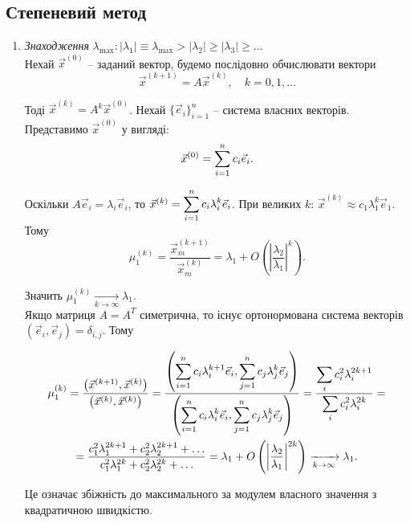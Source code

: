 \subsection{Степеневий метод}
\begin{enumerate}
	\item \textit{Знаходження} $\lambda_{\max}: |\lambda_1|\equiv\lambda_{\max}> |\lambda_2| \ge |\lambda_3| \ge \ldots$ \\

	Нехай $\vec x^{(0)}$ -- заданий вектор, будемо послідовно обчислювати вектори
	\begin{equation}
		\label{eq:5.2}
		\vec x^{(k+1)} = A \vec x^{(k)}, \quad k = 0, 1, \ldots
	\end{equation}

	Тоді $\vec x^{(k)} = A^k \vec x^{(0)}$. Нехай $\{\vec e_i\}_{i=1}^n$ -- система власних векторів. Представимо $\vec x^{(0)}$ у вигляді: \[ \vec x^{(0)} = \displaystyle\sum\limits_{i=1}^n c_i \vec e_i. \]

	Оскільки $A \vec e_i = \lambda_i \vec e_i$, то $\vec x^{(k)} = \displaystyle\sum\limits_{i=1}^n c_i \lambda_i^k \vec e_i$. При великих $k$: $\vec x^{(k)} \approx c_1 \lambda_1^k \vec e_1$. \\

	Тому \[ \mu_1^{(k)} = \dfrac{\vec x_m^{(k+1)}}{\vec x_m^{(k)}} = \lambda_1 + O \left( \left| \dfrac{\lambda_2}{\lambda_1} \right|^k \right). \]

	Значить $\mu_1^{(k)} \xrightarrow[k\to\infty]{} \lambda_1$. \\

	Якщо матриця $A = A^T$ симетрична, то існує ортонормована система векторів $(\vec e_i, \vec e_j) = \delta_{i,j}$. Тому

	\begin{multline*}
		\mu_1^{(k)} = \dfrac{\left(\vec x^{(k+1)}, \vec x^{(k)}\right)}{\left(\vec x^{(k)}, \vec x^{(k)}\right)} = \dfrac{\left(\displaystyle\sum\limits_{i=1}^n c_i \lambda_i^{k+1} \vec e_i,\displaystyle\sum\limits_{j=1}^n c_j \lambda_j^k \vec e_j\right)}{\left(\displaystyle\sum\limits_{i=1}^n c_i \lambda_i^k \vec e_i,\displaystyle\sum\limits_{j=1}^n c_j \lambda_j^k \vec e_j\right)} = \dfrac{\displaystyle\sum\limits_i c_i^2 \lambda_i^{2k+1}}{\displaystyle\sum\limits_i c_i^2 \lambda_i^{2k}} = \\
		= \dfrac{c_1^2\lambda_1^{2k+1}+c_2^2\lambda_2^{2k+1}+\ldots}{c_1^2\lambda_1^{2k}+c_2^2\lambda_2^{2k}+\ldots} = \lambda_1 + O \left( \left| \dfrac{\lambda_2}{\lambda_1} \right|^{2k} \right) \xrightarrow[k\to\infty]{} \lambda_1.
	\end{multline*}

	Це означає збіжність до максимального за модулем власного значення з квадратичною швидкістю.\\


\end{enumerate}
